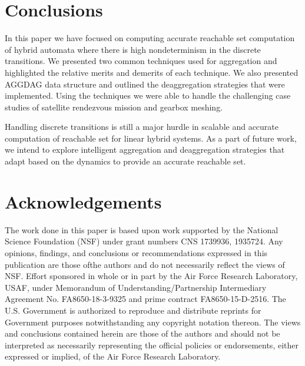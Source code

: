 \documentclass[acmsmall]{acmart}
\begin{document}


\maketitle

%
%
%






\section{Conclusions}
In this paper we have focused on computing accurate reachable set computation of hybrid automata where there is high nondeterminism in the discrete transitions. We presented two common techniques used for aggregation and highlighted the relative merits and demerits of each technique. We also presented AGGDAG data structure and outlined the deaggregation strategies that were implemented. Using the techniques we were able to handle the challenging case studies of satellite rendezvous mission and gearbox meshing.

Handling discrete transitions is still a major hurdle in scalable and accurate computation of reachable set for linear hybrid systems. As a part of future work, we intend to explore intelligent aggregation and deaggregation strategies that adapt based on the dynamics to provide an accurate reachable set.

\section*{Acknowledgements} The work done in this paper is based upon work supported by the National Science Foundation (NSF) under grant numbers CNS 1739936, 1935724. Any opinions, findings, and conclusions or recommendations expressed in this publication are those ofthe authors and do not necessarily reflect the views of NSF.
%
Effort sponsored in whole or in part by the Air Force Research Laboratory, USAF, under Memorandum of Understanding/Partnership Intermediary Agreement No. 
FA8650-18-3-9325 and prime contract FA8650-15-D-2516.  The U.S. Government is authorized to reproduce and distribute reprints for Government purposes notwithstanding any copyright notation thereon. The views and conclusions contained herein are those of the authors and should not be interpreted as necessarily representing the official policies or endorsements, either expressed or implied, of the Air Force Research Laboratory.


\vspace{-0.2cm}


\end{document}
